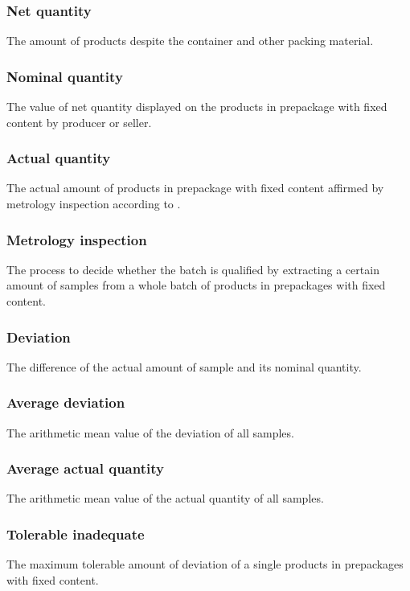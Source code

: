 \documentclass[conf]{new-aiaa}
\begin{document}
\subsubsection*{Net quantity}
The amount of products despite the container and other packing material.

\subsubsection*{Nominal quantity}
The value of net quantity displayed on the products in prepackage with fixed content by producer or seller.

\subsubsection*{Actual quantity}
The actual amount of products in prepackage with fixed content affirmed by metrology inspection according to \cite{GBT}.

\subsubsection*{Metrology inspection}
The process to decide whether the batch is qualified by extracting a certain amount of samples from a whole batch of products in prepackages with fixed content.

\subsubsection*{Deviation}
The difference of the actual amount of sample and its nominal quantity.

\subsubsection*{Average deviation}
The arithmetic mean value of the deviation of all samples.

\subsubsection*{Average actual quantity}
The arithmetic mean value of the actual quantity of all samples. 

\subsubsection*{Tolerable inadequate}
The maximum tolerable amount of deviation of a single products in prepackages with fixed content.
\end{document}
